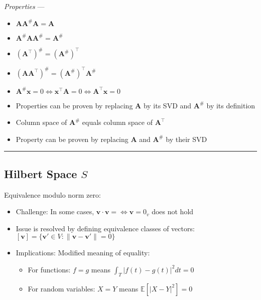 \emph{Properties} --- 
\begin{multicols}{2}
\begin{itemize}
    \item $\boldsymbol{A}\boldsymbol{A}^{\#}\boldsymbol{A} = \boldsymbol{A}$
    \item $\boldsymbol{A}^{\#}\boldsymbol{A}\boldsymbol{A}^{\#} = \boldsymbol{A}^{\#}$
    \item $(\boldsymbol{A}^\intercal)^{\#} = (\boldsymbol{A}^{\#})^\intercal$
    \item $(\boldsymbol{A}\boldsymbol{A}^\intercal)^{\#} = (\boldsymbol{A}^{\#})^\intercal\boldsymbol{A}^{\#}$
    \item $\boldsymbol{A}^{\#} \boldsymbol{x} = 0 \Leftrightarrow \boldsymbol{x}^\intercal \boldsymbol{A} = 0 \Leftrightarrow \boldsymbol{A}^\intercal \boldsymbol{x} = 0$
    \item Properties can be proven by replacing $\boldsymbol{A}$ by its SVD and $\boldsymbol{A}^{\#}$ by its definition
    \item Column space of $\boldsymbol{A}^{\#}$ equals column space of $\boldsymbol{A}^\intercal$
    \item Property can be proven by replacing $\boldsymbol{A}$ and $\boldsymbol{A}^{\#}$ by their SVD 
\end{itemize}
\end{multicols}

{\color{black}\hrule height 0.001mm}

\subsection*{Hilbert Space $S$}
Equivalence modulo norm zero:
\begin{itemize}
    \item Challenge: In some cases, $\boldsymbol{v} \cdot \boldsymbol{v} = \Leftrightarrow \boldsymbol{v} = 0_v$ does not hold
    \item Issue is resolved by defining equivalence classes of vectors: $[\boldsymbol{v}] = \{\boldsymbol{v}' \in V : \|\boldsymbol{v} - \boldsymbol{v}'\| = 0\}$
    \item Implications: Modified meaning of equality: 
    \begin{itemize}
        \item For functions: $f = g$ means $\int_T |f(t) - g(t)|^2 dt = 0$
        \item For random variables: $X = Y$ means $\mathbb{E}[|X - Y|^2] = 0$
    \end{itemize}
\end{itemize} 

